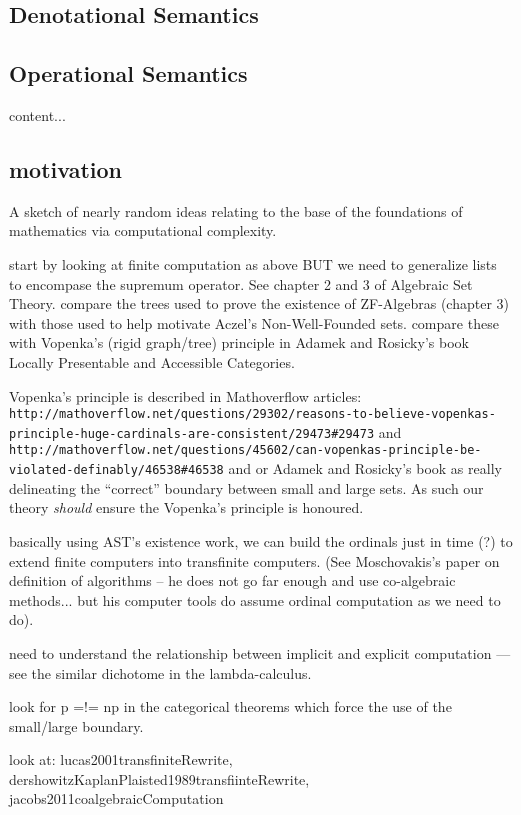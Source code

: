 \documentclass[a4paper,openany]{amsbook}
\begin{document}
\subsection{Denotational Semantics}



\subsection{Operational Semantics}



\begin{definition}
content...
\end{definition}

\subsection{motivation}

A sketch of nearly random ideas relating to the base of the foundations of
mathematics via computational complexity.

start by looking at finite computation as above BUT we need to generalize lists
to encompase the supremum operator. See chapter 2 and 3 of Algebraic Set Theory.
compare the trees used to prove the existence of ZF-Algebras (chapter 3) with
those used to help motivate Aczel's Non-Well-Founded sets. compare these with
Vopenka's (rigid graph/tree) principle in Adamek and Rosicky's book Locally
Presentable and Accessible Categories.

Vopenka's principle is described in Mathoverflow articles:
\verb|http://mathoverflow.net/questions/29302/reasons-to-believe-vopenkas-principle-huge-cardinals-are-consistent/29473#29473|
and
\verb|http://mathoverflow.net/questions/45602/can-vopenkas-principle-be-violated-definably/46538#46538|
and or Adamek and Rosicky's book as really delineating the ``correct'' boundary
between small and large sets. As such our theory \emph{should} ensure the
Vopenka's principle is honoured.

basically using AST's existence work, we can build the ordinals just in time (?)
to extend finite computers into transfinite computers. (See Moschovakis's paper
on definition of algorithms -- he does not go far enough and use co-algebraic
methods... but his computer tools do assume ordinal computation as we need to
do).

need to understand the relationship between implicit and explicit computation
--- see the similar dichotome in the lambda-calculus.

look for p =!= np in the categorical theorems which force the use of the
small/large boundary.

look at: lucas2001transfiniteRewrite,
dershowitzKaplanPlaisted1989transfiinteRewrite,
jacobs2011coalgebraicComputation



\end{document}
